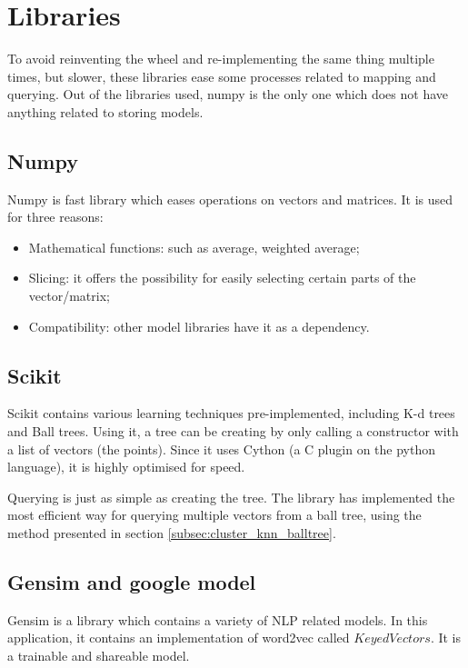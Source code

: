 \section{Libraries}
\label{sec:app_libraries}

To avoid reinventing the wheel and re-implementing the same thing multiple times, but slower, these libraries ease some processes related to mapping and querying. Out of the libraries used, numpy is the only one which does not have anything related to storing models.

\subsection{Numpy}
\label{subsec:app_libraries_numpy}

Numpy is fast library which eases operations on vectors and matrices. It is used for three reasons:

\begin{itemize}
\item{Mathematical functions: such as average, weighted average;}
\item{Slicing: it offers the possibility for easily selecting certain parts of the vector/matrix;}
\item{Compatibility: other model libraries have it as a dependency.}
\end{itemize}

\subsection{Scikit}
\label{subsec:app_libraries_scikit}

Scikit contains various learning techniques pre-implemented, including K-d trees and Ball trees. Using it, a tree can be creating by only calling a constructor with a list of vectors (the points). Since it uses Cython (a C plugin on the python language), it is highly optimised for speed.

Querying is just as simple as creating the tree. The library has implemented the most efficient way for querying multiple vectors from a ball tree, using the method presented in section \ref{subsec:cluster_knn_balltree}.

\subsection{Gensim and google model}
\label{subsec:app_libraries_gensim}

Gensim is a library which contains a variety of NLP related models. In this application, it contains an implementation of word2vec called $KeyedVectors$. It is a trainable and shareable model.

